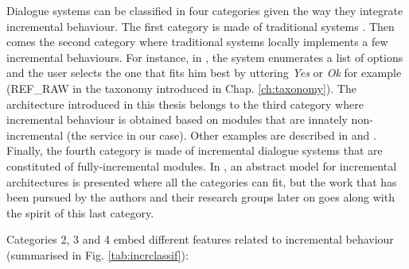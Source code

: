     	Dialogue systems can be classified in four categories given the way they integrate incremental behaviour. The first category is made of traditional systems \cite{CLASSiCd64}. Then comes the second category where traditional systems locally implements a few incremental behaviours. For instance, in \cite{El-Asri2014a}, the system enumerates a list of options and the user selects the one that fits him best by uttering \textit{Yes} or \textit{Ok} for example (REF\_RAW in the taxonomy introduced in Chap. \ref{ch:taxonomy}). The architecture introduced in this thesis belongs to the third category where incremental behaviour is obtained based on modules that are innately non-incremental (the service in our case). Other examples are described in \cite{Selfridge2012a} and \cite{Hastie2013}. Finally, the fourth category is made of incremental dialogue systems that are constituted of fully-incremental modules. In \cite{Schlangen2011}, an abstract model for incremental architectures is presented where all the categories can fit, but the work that has been pursued by the authors and their research groups later on goes along with the spirit of this last category.
		
		Categories 2, 3 and 4 embed different features related to incremental behaviour (summarised in Fig. \ref{tab:incrclassif}):

